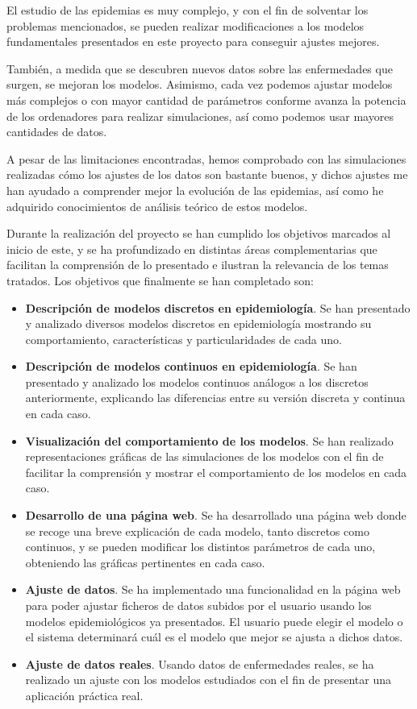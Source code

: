 El estudio de las epidemias es muy complejo, y con el fin de solventar los problemas mencionados, se pueden realizar modificaciones a los modelos fundamentales presentados en este proyecto para conseguir ajustes mejores.

También, a medida que se descubren nuevos datos sobre las enfermedades que surgen, se mejoran los modelos. Asimismo, cada vez podemos ajustar modelos más complejos o con mayor cantidad de parámetros conforme avanza la potencia de los ordenadores para realizar simulaciones, así como podemos usar mayores cantidades de datos.

A pesar de las limitaciones encontradas, hemos comprobado con las simulaciones realizadas cómo los ajustes de los datos son bastante buenos, y dichos ajustes me han ayudado a comprender mejor la evolución de las epidemias, así como he adquirido conocimientos de análisis teórico de estos modelos.


Durante la realización del proyecto se han cumplido los objetivos marcados al inicio de este, y se ha profundizado en distintas áreas complementarias que facilitan la comprensión de lo presentado e ilustran la relevancia de los temas tratados. Los objetivos que finalmente se han completado son:

\begin{itemize}
\item \textbf{Descripción de modelos discretos en epidemiología}. Se han presentado y analizado diversos modelos discretos en epidemiología mostrando su comportamiento, características y particularidades de cada uno.
\item \textbf{Descripción de modelos continuos en epidemiología}. Se han presentado y analizado los modelos continuos análogos a los discretos anteriormente, explicando las diferencias entre su versión discreta y continua en cada caso.
\item \textbf{Visualización del comportamiento de los modelos}. Se han realizado representaciones gráficas de las simulaciones de los modelos con el fin de facilitar la comprensión y mostrar el comportamiento de los modelos en cada caso.
\item \textbf{Desarrollo de una página web}. Se ha desarrollado una página web donde se recoge una breve explicación de cada modelo, tanto discretos como continuos, y se pueden modificar los distintos parámetros de cada uno, obteniendo las gráficas pertinentes en cada caso.
\item \textbf{Ajuste de datos}. Se ha implementado una funcionalidad en la página web para poder ajustar ficheros de datos subidos por el usuario usando los modelos epidemiológicos ya presentados. El usuario puede elegir el modelo o el sistema determinará cuál es el modelo que mejor se ajusta a dichos datos.
\item \textbf{Ajuste de datos reales}. Usando datos de enfermedades reales, se ha realizado un ajuste con los modelos estudiados con el fin de presentar una aplicación práctica real.
\end{itemize}

